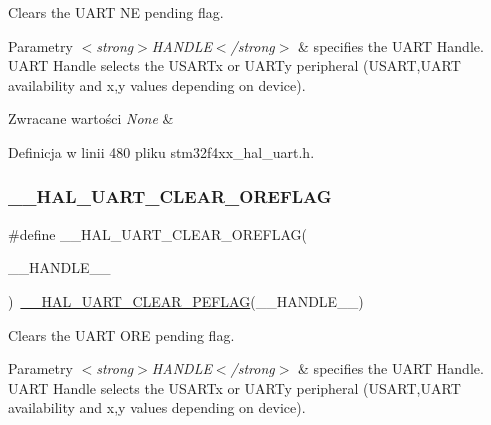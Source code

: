 Clears the U\+A\+RT NE pending flag. 


\begin{DoxyParams}{Parametry}
{\em $<$strong$>$\+H\+A\+N\+D\+L\+E$<$/strong$>$} & specifies the U\+A\+RT Handle. U\+A\+RT Handle selects the U\+S\+A\+R\+Tx or U\+A\+R\+Ty peripheral (U\+S\+A\+RT,U\+A\+RT availability and x,y values depending on device). \\
\hline
\end{DoxyParams}

\begin{DoxyRetVals}{Zwracane wartości}
{\em None} & \\
\hline
\end{DoxyRetVals}


Definicja w linii 480 pliku stm32f4xx\+\_\+hal\+\_\+uart.\+h.

\mbox{\label{group___u_a_r_t___exported___macros_ga9cdc2f2d55eaaa7895996bf6848df42e}} 
\subsubsection{\texorpdfstring{\+\_\+\+\_\+\+H\+A\+L\+\_\+\+U\+A\+R\+T\+\_\+\+C\+L\+E\+A\+R\+\_\+\+O\+R\+E\+F\+L\+AG}{\_\_HAL\_UART\_CLEAR\_OREFLAG}}
{\footnotesize\ttfamily \#define \+\_\+\+\_\+\+H\+A\+L\+\_\+\+U\+A\+R\+T\+\_\+\+C\+L\+E\+A\+R\+\_\+\+O\+R\+E\+F\+L\+AG(\begin{DoxyParamCaption}\item[{}]{\+\_\+\+\_\+\+H\+A\+N\+D\+L\+E\+\_\+\+\_\+ }\end{DoxyParamCaption})~\hyperlink{group___u_a_r_t___exported___macros_gaba5e19c60e0f37341b1585a380b84d49}{\+\_\+\+\_\+\+H\+A\+L\+\_\+\+U\+A\+R\+T\+\_\+\+C\+L\+E\+A\+R\+\_\+\+P\+E\+F\+L\+AG}(\+\_\+\+\_\+\+H\+A\+N\+D\+L\+E\+\_\+\+\_\+)}



Clears the U\+A\+RT O\+RE pending flag. 


\begin{DoxyParams}{Parametry}
{\em $<$strong$>$\+H\+A\+N\+D\+L\+E$<$/strong$>$} & specifies the U\+A\+RT Handle. U\+A\+RT Handle selects the U\+S\+A\+R\+Tx or U\+A\+R\+Ty peripheral (U\+S\+A\+RT,U\+A\+RT availability and x,y values depending on device). \\
\hline
\end{DoxyParams}

